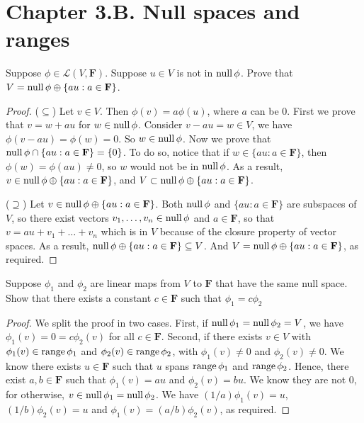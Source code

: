 \section*{Chapter 3.B. Null spaces and ranges}


\begin{exercise}{29}
 Suppose $\phi\in\mathcal{L}(V,\mathbf{F})$. Suppose $u\in V$ is not in $\operatorname*{null}\phi$. Prove that $V=\operatorname*{null}\phi \oplus \{au: a\in \mathbf{F}\}$.
\end{exercise}
\begin{proof}
 ($\subseteq$) Let $v\in V$. Then $\phi(v)=a\phi(u)$, where $a$ can be 0. First we prove that $v=w+au$ for $w\in\operatorname*{null}\phi$. Consider $v-au=w\in V$, we have $\phi(v-au)=\phi(w)=0$. So $w\in\operatorname*{null}\phi$. 
 Now we prove that $\operatorname*{null}\phi\cap\{au:a\in\mathbf{F}\}=\{0\}$. To do so, notice that if $w\in\{au:a\in\mathbf{F}\}$, then $\phi(w)=\phi(au)\neq0$, so $w$ would not be in $\operatorname*{null}\phi$.
 As a result, $v\in\operatorname*{null}\phi\oplus\{au:a\in\mathbf{F}\}$, and $V\subset\operatorname*{null}\phi\oplus\{au:a\in\mathbf{F}\}$.
 
 ($\supseteq$) Let $v\in\operatorname*{null}\phi\oplus\{au:a\in\mathbf{F}\}$. Both $\operatorname*{null}\phi$ and $\{au:a\in\mathbf{F}\}$ are subspaces of $V$, so there exist vectors $v_{1},\dots,v_{n}\in\operatorname*{null}\phi$ and $a\in\mathbf{F}$, so that $v=au+v_{1}+\dots+v_{n}$ which is in $V$ because of the closure property of vector spaces. As a result,  $\operatorname*{null}\phi\oplus\{au:a\in\mathbf{F}\}\subseteq V$. And $V=\operatorname*{null}\phi \oplus \{au: a\in \mathbf{F}\}$, as required.
\end{proof}


\begin{exercise}{30}
Suppose $\phi_{1}$ and $\phi_{2}$ are linear maps from $V$ to $\mathbf{F}$ that have the same null space. Show that there exists a constant $c\in\mathbf{F}$ such that $\phi_{1}=c\phi_{2}$
\end{exercise}
\begin{proof}
We split the proof in two cases. First, if $\operatorname*{null}\phi_{1}=\operatorname*{null}\phi_{2}=V$, we have $\phi_{1}(v)=0=c\phi_{2}(v)$ for all $c\in\mathbf{F}$. Second, if there exists $v\in V$ with $\phi_{1}(v)\in\operatorname*{range}\phi_{1}$ and $\phi_{2}(v)\in\operatorname*{range}\phi_{2}$, with $\phi_{1}(v)\neq0$ and $\phi_{2}(v)\neq0$. We know there exists $u\in\mathbf{F}$ such that $u$ spans $\operatorname*{range}\phi_{1}$ and $\operatorname*{range}\phi_{2}$. Hence, there exist $a,b\in\mathbf{F}$ such that $\phi_{1}(v)=au$ and $\phi_{2}(v)=bu$. We know they are not 0, for otherwise, $v\in\operatorname*{null}\phi_{1}=\operatorname*{null}\phi_{2}$. We have $(1/a)\phi_{1}(v)=u$, $(1/b)\phi_{2}(v)=u$ and $\phi_{1}(v)=(a/b)\phi_{2}(v)$, as required.
\end{proof}
